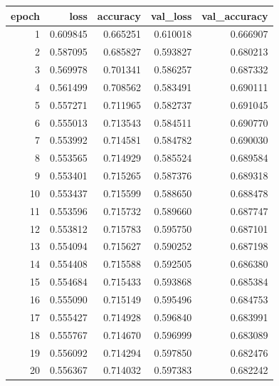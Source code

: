 \begin{tabular}{rrrrr}
\toprule
epoch & loss & accuracy & val_loss & val_accuracy \\
\midrule
1 & 0.609845 & 0.665251 & 0.610018 & 0.666907 \\
2 & 0.587095 & 0.685827 & 0.593827 & 0.680213 \\
3 & 0.569978 & 0.701341 & 0.586257 & 0.687332 \\
4 & 0.561499 & 0.708562 & 0.583491 & 0.690111 \\
5 & 0.557271 & 0.711965 & 0.582737 & 0.691045 \\
6 & 0.555013 & 0.713543 & 0.584511 & 0.690770 \\
7 & 0.553992 & 0.714581 & 0.584782 & 0.690030 \\
8 & 0.553565 & 0.714929 & 0.585524 & 0.689584 \\
9 & 0.553401 & 0.715265 & 0.587376 & 0.689318 \\
10 & 0.553437 & 0.715599 & 0.588650 & 0.688478 \\
11 & 0.553596 & 0.715732 & 0.589660 & 0.687747 \\
12 & 0.553812 & 0.715783 & 0.595750 & 0.687101 \\
13 & 0.554094 & 0.715627 & 0.590252 & 0.687198 \\
14 & 0.554408 & 0.715588 & 0.592505 & 0.686380 \\
15 & 0.554684 & 0.715433 & 0.593868 & 0.685384 \\
16 & 0.555090 & 0.715149 & 0.595496 & 0.684753 \\
17 & 0.555427 & 0.714928 & 0.596840 & 0.683991 \\
18 & 0.555767 & 0.714670 & 0.596999 & 0.683089 \\
19 & 0.556092 & 0.714294 & 0.597850 & 0.682476 \\
20 & 0.556367 & 0.714032 & 0.597383 & 0.682242 \\
\bottomrule
\end{tabular}
